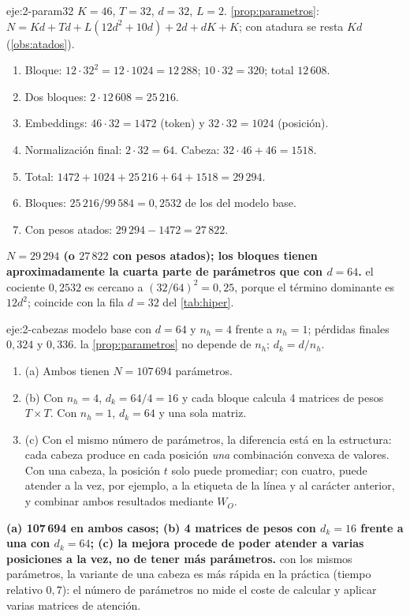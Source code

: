 \begin{solucion}{eje:2-param32}
\datos $K=46$, $T=32$, $d=32$, $L=2$.
\planteamiento \cref{prop:parametros}: $N=Kd+Td+L(12d^{2}+10d)+2d+dK+K$; con atadura se resta $Kd$ (\cref{obs:atados}).
\pasos
\begin{enumerate}[label=\arabic*.]
  \item Bloque: $12\cdot 32^{2}=12\cdot 1024=12\,288$; $10\cdot 32=320$; total $12\,608$.
  \item Dos bloques: $2\cdot 12\,608=25\,216$.
  \item Embeddings: $46\cdot 32=1472$ (token) y $32\cdot 32=1024$ (posición).
  \item Normalización final: $2\cdot 32=64$. Cabeza: $32\cdot 46+46=1518$.
  \item Total: $1472+1024+25\,216+64+1518=29\,294$.
  \item Bloques: $25\,216/99\,584=0{,}2532$ de los del modelo base.
  \item Con pesos atados: $29\,294-1472=27\,822$.
\end{enumerate}
\resultado \textbf{$N=29\,294$ (o $27\,822$ con pesos atados); los bloques tienen aproximadamente la cuarta parte de parámetros que con $d=64$.}
\comprobacion el cociente $0{,}2532$ es cercano a $(32/64)^{2}=0{,}25$, porque el término dominante es $12d^{2}$; coincide con la fila $d=32$ del \cref{tab:hiper}.
\end{solucion}

\begin{solucion}{eje:2-cabezas}
\datos modelo base con $d=64$ y $n_h=4$ frente a $n_h=1$; pérdidas finales $0{,}324$ y $0{,}336$.
\planteamiento la \cref{prop:parametros} no depende de $n_h$; $d_k=d/n_h$.
\pasos
\begin{enumerate}[label=\arabic*.]
  \item (a) Ambos tienen $N=107\,694$ parámetros.
  \item (b) Con $n_h=4$, $d_k=64/4=16$ y cada bloque calcula 4 matrices de pesos $T\times T$. Con $n_h=1$, $d_k=64$ y una sola matriz.
  \item (c) Con el mismo número de parámetros, la diferencia está en la estructura: cada cabeza produce en cada posición \emph{una} combinación convexa de valores. Con una cabeza, la posición $t$ solo puede promediar; con cuatro, puede atender a la vez, por ejemplo, a la etiqueta de la línea y al carácter anterior, y combinar ambos resultados mediante $W_O$.
\end{enumerate}
\resultado \textbf{(a) 107\,694 en ambos casos; (b) 4 matrices de pesos con $d_k=16$ frente a una con $d_k=64$; (c) la mejora procede de poder atender a varias posiciones a la vez, no de tener más parámetros.}
\comprobacion con los mismos parámetros, la variante de una cabeza es más rápida en la práctica (tiempo relativo $0{,}7$): el número de parámetros no mide el coste de calcular y aplicar varias matrices de atención.
\end{solucion}

